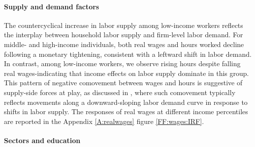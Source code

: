 \documentclass[a4paper,12pt]{article}%
\begin{document}
\paragraph{Supply and demand factors}
The countercyclical increase in labor supply among low-income workers reflects the interplay between household labor supply and firm-level labor demand. For middle- and high-income individuals, both real wages and hours worked decline following a monetary tightening, consistent with a leftward shift in labor demand. In contrast, among low-income workers, we observe rising hours despite falling real wages-indicating that income effects on labor supply dominate in this group. This pattern of negative comovement between wages and hours is suggestive of supply-side forces at play, as discussed in \citet{katz1992changes}, where such comovement typically reflects movements along a downward-sloping labor demand curve in response to shifts in labor supply. The responses of real wages at different income percentiles are reported in the Appendix \ref{A:realwages} figure \ref{FF:wages:IRF}. 

\paragraph{Sectors and education}
\end{document}
